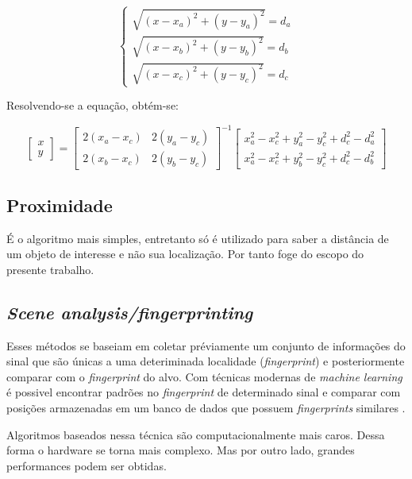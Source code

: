 \begin{equation*}
\begin{cases} \sqrt{(x - x_a)^2 + (y - y_a)^2} = d_a \\ \sqrt{(x - x_b)^2 + (y - y_b)^2} = d_b \\ \sqrt{(x - x_c)^2 + (y - y_c)^2} = d_c \end{cases}
\end{equation*}

Resolvendo-se a equação, obtém-se:

\begin{equation*}
\begin{bmatrix} 
	x \\
	y
\end{bmatrix} = 
\begin{bmatrix} 
	2(x_a - x_c) & 2(y_a - y_c) \\
	2(x_b - x_c) & 2(y_b - y_c)
\end{bmatrix}^{-1}
\begin{bmatrix} 
	x_a^2 - x_c^2 + y_a^2 - y_c^2 + d_c^2 - d_a^2 \\
	x_a^2 - x_c^2 + y_b^2 - y_c^2 + d_c^2 - d_b^2
\end{bmatrix}
\end{equation*}


\subsection{Proximidade}
É o algoritmo mais simples, entretanto só é utilizado para saber a distância de um objeto de interesse e não sua localização. Por tanto foge do escopo do presente trabalho.


\subsection{\textit{Scene analysis/fingerprinting}}

Esses métodos se baseiam em coletar préviamente um conjunto de informações do sinal que são únicas a uma deteriminada localidade (\textit{fingerprint}) e posteriormente comparar com o \textit{fingerprint} do alvo. Com técnicas modernas de \textit{machine learning} é possivel encontrar padrões no \textit{fingerprint} de determinado sinal e comparar com posições armazenadas em um banco de dados que possuem \textit{fingerprints} similares \cite{art13}.

Algoritmos baseados nessa técnica são computacionalmente mais caros. Dessa forma o hardware se torna mais complexo. Mas por outro lado, grandes performances podem ser obtidas.

